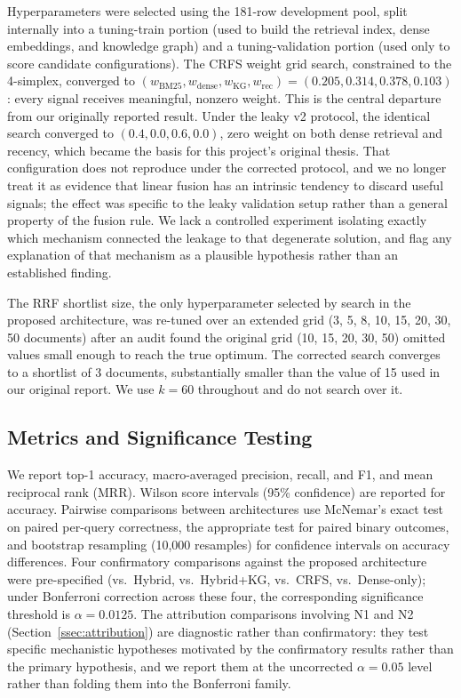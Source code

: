 \documentclass[10pt,conference]{IEEEtran}
\begin{document}
Hyperparameters were selected using the 181-row development pool, split internally into a tuning-train portion (used to build the retrieval index, dense embeddings, and knowledge graph) and a tuning-validation portion (used only to score candidate configurations). The CRFS weight grid search, constrained to the 4-simplex, converged to $(w_{\text{BM25}}, w_{\text{dense}}, w_{\text{KG}}, w_{\text{rec}}) = (0.205, 0.314, 0.378, 0.103)$: every signal receives meaningful, nonzero weight. This is the central departure from our originally reported result. Under the leaky v2 protocol, the identical search converged to $(0.4, 0.0, 0.6, 0.0)$, zero weight on both dense retrieval and recency, which became the basis for this project's original thesis. That configuration does not reproduce under the corrected protocol, and we no longer treat it as evidence that linear fusion has an intrinsic tendency to discard useful signals; the effect was specific to the leaky validation setup rather than a general property of the fusion rule. We lack a controlled experiment isolating exactly which mechanism connected the leakage to that degenerate solution, and flag any explanation of that mechanism as a plausible hypothesis rather than an established finding.

The RRF shortlist size, the only hyperparameter selected by search in the proposed architecture, was re-tuned over an extended grid (3, 5, 8, 10, 15, 20, 30, 50 documents) after an audit found the original grid (10, 15, 20, 30, 50) omitted values small enough to reach the true optimum. The corrected search converges to a shortlist of 3 documents, substantially smaller than the value of 15 used in our original report. We use $k=60$ throughout and do not search over it.

\subsection{Metrics and Significance Testing}

We report top-1 accuracy, macro-averaged precision, recall, and F1, and mean reciprocal rank (MRR). Wilson score intervals \cite{wilson1927} (95\% confidence) are reported for accuracy. Pairwise comparisons between architectures use McNemar's exact test \cite{mcnemar1947} on paired per-query correctness, the appropriate test for paired binary outcomes, and bootstrap resampling (10,000 resamples) \cite{efron1993bootstrap} for confidence intervals on accuracy differences. Four confirmatory comparisons against the proposed architecture were pre-specified (vs.\ Hybrid, vs.\ Hybrid+KG, vs.\ CRFS, vs.\ Dense-only); under Bonferroni correction across these four, the corresponding significance threshold is $\alpha=0.0125$. The attribution comparisons involving N1 and N2 (Section~\ref{ssec:attribution}) are diagnostic rather than confirmatory: they test specific mechanistic hypotheses motivated by the confirmatory results rather than the primary hypothesis, and we report them at the uncorrected $\alpha=0.05$ level rather than folding them into the Bonferroni family.
\end{document}
